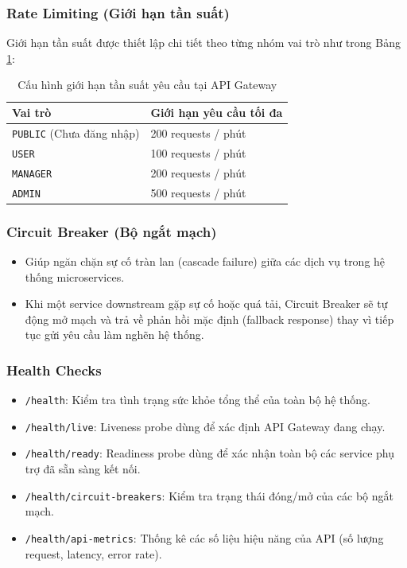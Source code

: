 \documentclass[12pt,a4paper]{report}
\begin{document}
\subsubsection{Rate Limiting (Giới hạn tần suất)}
Giới hạn tần suất được thiết lập chi tiết theo từng nhóm vai trò như trong Bảng \ref{tab:rate_limiting}:
\begin{table}[H]
\centering
\caption{Cấu hình giới hạn tần suất yêu cầu tại API Gateway}
\label{tab:rate_limiting}
\begin{tabularx}{\textwidth}{|l|X|}
\hline
\rowcolor{gray!10}
Vai trò & Giới hạn yêu cầu tối đa \\ \hline
\texttt{PUBLIC} (Chưa đăng nhập) & 200 requests / phút \\ \hline
\texttt{USER} & 100 requests / phút \\ \hline
\texttt{MANAGER} & 200 requests / phút \\ \hline
\texttt{ADMIN} & 500 requests / phút \\ \hline
\end{tabularx}
\end{table}

\subsubsection{Circuit Breaker (Bộ ngắt mạch)}
\begin{itemize}
    \item Giúp ngăn chặn sự cố tràn lan (cascade failure) giữa các dịch vụ trong hệ thống microservices.
    \item Khi một service downstream gặp sự cố hoặc quá tải, Circuit Breaker sẽ tự động mở mạch và trả về phản hồi mặc định (fallback response) thay vì tiếp tục gửi yêu cầu làm nghẽn hệ thống.
\end{itemize}

\subsubsection{Health Checks}
\begin{itemize}
    \item \texttt{/health}: Kiểm tra tình trạng sức khỏe tổng thể của toàn bộ hệ thống.
    \item \texttt{/health/live}: Liveness probe dùng để xác định API Gateway đang chạy.
    \item \texttt{/health/ready}: Readiness probe dùng để xác nhận toàn bộ các service phụ trợ đã sẵn sàng kết nối.
    \item \texttt{/health/circuit-breakers}: Kiểm tra trạng thái đóng/mở của các bộ ngắt mạch.
    \item \texttt{/health/api-metrics}: Thống kê các số liệu hiệu năng của API (số lượng request, latency, error rate).
\end{itemize}
\end{document}
